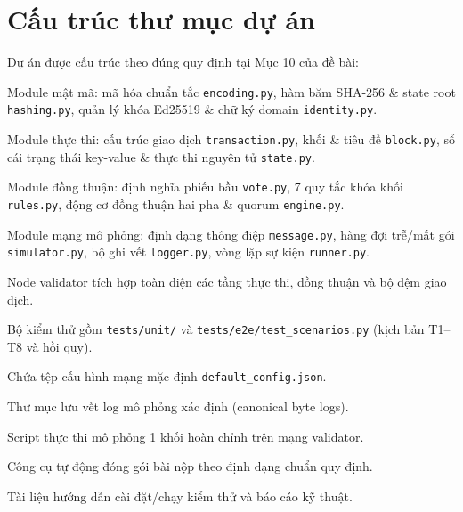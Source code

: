\documentclass[10pt,a4paper]{report}
\begin{document}
\section{Cấu trúc thư mục dự án}
Dự án được cấu trúc theo đúng quy định tại Mục 10 của đề bài:
\begin{description}[leftmargin=1.2em, itemsep=1.5pt]
  \item[\texttt{src/crypto/}] Module mật mã: mã hóa chuẩn tắc \texttt{encoding.py}, hàm băm SHA-256 \& state root \texttt{hashing.py}, quản lý khóa Ed25519 \& chữ ký domain \texttt{identity.py}.
  \item[\texttt{src/execution/}] Module thực thi: cấu trúc giao dịch \texttt{transaction.py}, khối \& tiêu đề \texttt{block.py}, sổ cái trạng thái key-value \& thực thi nguyên tử \texttt{state.py}.
  \item[\texttt{src/consensus/}] Module đồng thuận: định nghĩa phiếu bầu \texttt{vote.py}, 7 quy tắc khóa khối \texttt{rules.py}, động cơ đồng thuận hai pha \& quorum \texttt{engine.py}.
  \item[\texttt{src/network/}] Module mạng mô phỏng: định dạng thông điệp \texttt{message.py}, hàng đợi trễ/mất gói \texttt{simulator.py}, bộ ghi vết \texttt{logger.py}, vòng lặp sự kiện \texttt{runner.py}.
  \item[\texttt{src/node.py}] Node validator tích hợp toàn diện các tầng thực thi, đồng thuận và bộ đệm giao dịch.
  \item[\texttt{tests/}] Bộ kiểm thử gồm \texttt{tests/unit/} và \texttt{tests/e2e/test\_scenarios.py} (kịch bản T1--T8 và hồi quy).
  \item[\texttt{config/}] Chứa tệp cấu hình mạng mặc định \texttt{default\_config.json}.
  \item[\texttt{logs/}] Thư mục lưu vết log mô phỏng xác định (canonical byte logs).
  \item[\texttt{run\_simulation.py}] Script thực thi mô phỏng 1 khối hoàn chỉnh trên mạng validator.
  \item[\texttt{package\_submission.py}] Công cụ tự động đóng gói bài nộp theo định dạng chuẩn quy định.
  \item[\texttt{README.md}, \texttt{REPORT.pdf}] Tài liệu hướng dẫn cài đặt/chạy kiểm thử và báo cáo kỹ thuật.
\end{description}

\end{document}
